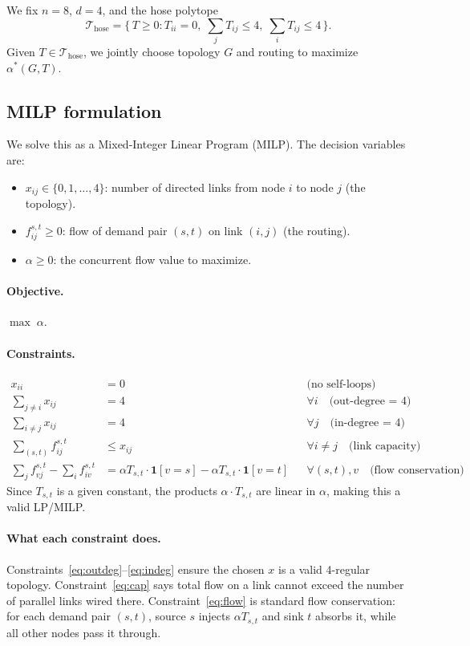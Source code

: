 \documentclass[11pt]{article}
\begin{document}
We fix $n=8$, $d=4$, and the hose polytope
\[
\mathcal{T}_{\text{hose}} = \big\{\, T \ge 0 : T_{ii}=0,\;
\textstyle\sum_j T_{ij} \le 4,\; \sum_i T_{ij} \le 4 \,\big\}.
\]
Given $T \in \mathcal{T}_{\text{hose}}$, we jointly choose topology $G$
and routing to maximize $\alpha^*(G,T)$.

\subsection*{MILP formulation}

We solve this as a Mixed-Integer Linear Program (MILP). The decision
variables are:
\begin{itemize}[leftmargin=*]
\item $x_{ij} \in \{0,1,\ldots,4\}$: number of directed links from node $i$ to node $j$ (the topology).
\item $f^{s,t}_{ij} \ge 0$: flow of demand pair $(s,t)$ on link $(i,j)$ (the routing).
\item $\alpha \ge 0$: the concurrent flow value to maximize.
\end{itemize}

\paragraph{Objective.} $\max\;\alpha$.

\paragraph{Constraints.}
\begin{align}
x_{ii} &= 0 && \text{(no self-loops)} \label{eq:noselfloop}\\
\sum_{j \neq i} x_{ij} &= 4 && \forall i \quad \text{(out-degree = 4)} \label{eq:outdeg}\\
\sum_{i \neq j} x_{ij} &= 4 && \forall j \quad \text{(in-degree = 4)} \label{eq:indeg}\\
\sum_{(s,t)} f^{s,t}_{ij} &\le x_{ij} && \forall i\neq j \quad \text{(link capacity)} \label{eq:cap}\\
\sum_{j} f^{s,t}_{vj} - \sum_{i} f^{s,t}_{iv}
  &= \alpha T_{s,t} \cdot \mathbf{1}[v{=}s] - \alpha T_{s,t} \cdot \mathbf{1}[v{=}t]
  && \forall (s,t), v \quad \text{(flow conservation)} \label{eq:flow}
\end{align}
Since $T_{s,t}$ is a given constant, the products $\alpha \cdot T_{s,t}$
are linear in $\alpha$, making this a valid LP/MILP.

\paragraph{What each constraint does.}
Constraints~\eqref{eq:outdeg}--\eqref{eq:indeg} ensure the chosen $x$
is a valid 4-regular topology. Constraint~\eqref{eq:cap} says total flow
on a link cannot exceed the number of parallel links wired there.
Constraint~\eqref{eq:flow} is standard flow conservation: for each
demand pair $(s,t)$, source $s$ injects $\alpha T_{s,t}$ and sink $t$
absorbs it, while all other nodes pass it through.
\end{document}
